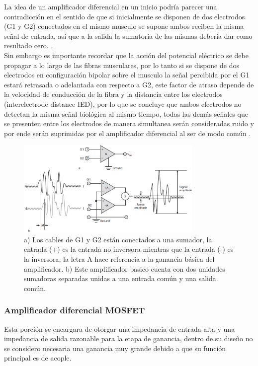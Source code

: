 La idea de un amplificador diferencial en un inicio podría parecer una contradicción en el sentido de que si inicialmente se disponen de dos electrodos (G1 y G2) conectados en el mismo musculo se supone ambos reciben la misma señal de entrada, así que a la salida la sumatoria de las mismas debería dar como resultado cero. \cite{kamen2010essentialselectromyography}. \\
Sin embargo es importante recordar que la acción del potencial eléctrico se debe propagar a lo largo de las fibras musculares, por lo tanto si se dispone de dos electrodos en configuración bipolar sobre el musculo la señal percibida por el G1 estará retrasada o adelantada con respecto a G2, este factor de atraso depende de la velocidad de conducción de la fibra y la distancia entre los electrodos (interelectrode distance IED), por lo que se concluye que ambos electrodos no detectan la misma señal biológica al mismo tiempo, todas las demás señales que se presenten entre los electrodos de manera simultanea serán consideradas ruido y por ende serán suprimidas por el amplificador diferencial al ser de modo común \cite{kamen2010essentialselectromyography}.

\begin{figure}[H]
  \centering
  \includegraphics[width=0.8\textwidth]{Capitulo_2/signalinput.png}
  \caption{a) Los cables de G1 y G2 están conectados a una sumador, la entrada (+) es la entrada no inversora mientras que la entrada (-) es la inversora, la letra A hace referencia a la ganancia básica del amplificador. b) Este amplificador basico cuenta con dos unidades sumadoras separadas unidas a una entrada común y una salida común.}
  \label{signalinput} 
\end{figure}
\subsubsection{Amplificador diferencial MOSFET}
Esta porción se encargara de otorgar una impedancia de entrada alta y una impedancia de salida razonable para la etapa de ganancia, dentro de su diseño no se considero necesaria una ganancia muy grande debido a que su función principal es de acople. \\

